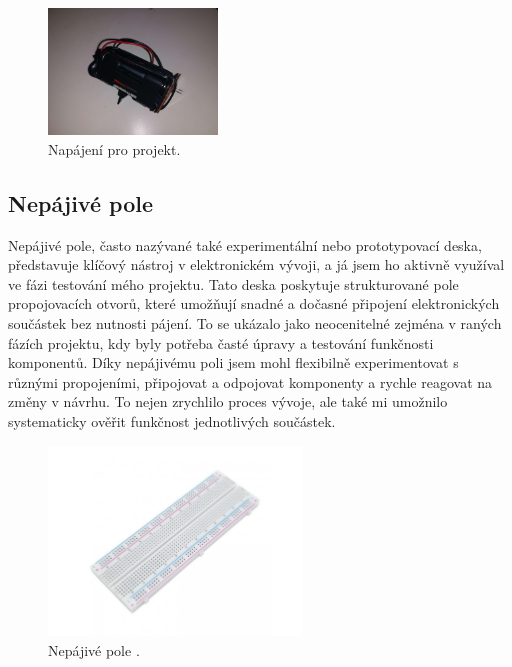 \documentclass[12pt, a4paper,
oneside
openany
]{report}
\begin{document}
	\vspace*{0.01\textheight}

	\begin{figure}[ht]
		\centering 
		\includegraphics[width=0.4\textwidth]{image/zdroj.jpg} %
		\caption{Napájení pro projekt.} 
	\end{figure}

\newpage
\subsection{Nepájivé pole}
\noindent Nepájivé pole, často nazývané také experimentální nebo prototypovací deska, představuje klíčový nástroj v elektronickém vývoji, a já jsem ho aktivně využíval ve fázi testování mého projektu. Tato deska poskytuje strukturované pole propojovacích otvorů, které umožňují snadné a dočasné připojení elektronických součástek bez nutnosti pájení. To se ukázalo jako neocenitelné zejména v raných fázích projektu, kdy byly potřeba časté úpravy a testování funkčnosti komponentů. Díky nepájivému poli jsem mohl flexibilně experimentovat s různými propojeními, připojovat a odpojovat komponenty a rychle reagovat na změny v návrhu. To nejen zrychlilo proces vývoje, ale také mi umožnilo systematicky ověřit funkčnost jednotlivých součástek.


	\begin{figure}[ht]
		\centering 
		\includegraphics[width=0.6\textwidth]{image/pole.jpg} %
		\caption{Nepájivé pole \cite{pole}.} 
	\end{figure}
\end{document}

